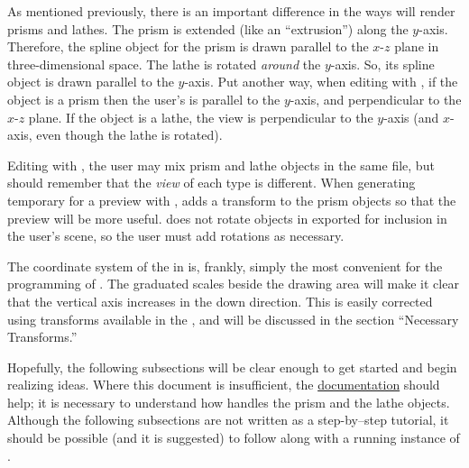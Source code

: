 	As mentioned previously, there is an important difference
	in the ways \IXpov{} will render prisms and lathes.
	The prism is extended (like an ``extrusion'') along the
	$y$-axis. Therefore, the spline object for the prism
	is drawn parallel to the $x$-$z$ plane in three-dimensional space.
	The lathe is rotated \emph{around} the $y$-axis. So, its
	spline object is drawn parallel to the $y$-axis. Put another way,
	when editing with \IXpkg{}, if the object is a prism
	then the user's  is parallel to the
	$y$-axis, and perpendicular to the $x$-$z$ plane. If the
	object is a lathe, the view is perpendicular to the $y$-axis
	(and $x$-axis, even though the lathe is rotated).
	
	Editing with \IXpkg{}, the user may mix prism and lathe
	objects in the same file, but should remember that the
	\emph{view} of each type is different. When generating
	temporary  for a preview with \IXpov{}, \IXpkg{}
	adds a  transform to the prism objects
	so that the preview will be more useful. \IXpkgu{} does
	not rotate objects in  exported for
	inclusion in the user's scene, so the user must add
	rotations as necessary.
	
	The coordinate system of the  in \IXpkg{}
	is, frankly, simply the most convenient for the programming
	of \IXpkg{}. The graduated scales beside the drawing area
	will make it clear that the vertical axis increases
	in the down direction. This is easily corrected using
	transforms available in the , and will be discussed
	in the section ``Necessary Transforms.''

	Hopefully, the following subsections will be clear enough
	to get started and begin realizing ideas. Where
	this document is insufficient, the \IXpov{}
	\href{\URLPOVdocs}{documentation} should help;
	it is necessary to understand how \IXpov{} handles the
	prism and the lathe objects.
	Although the following subsections are not written as a
	step-by--step tutorial, it should be possible
	(and it is suggested) to follow along with a running
	instance of \IXpkg{}.


